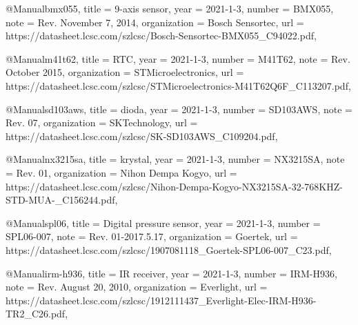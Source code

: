 @Manual{bmx055,
    title        = {9-axis sensor},
    year         = {2021-1-3},
    number       = {BMX055},
    note         = {Rev.  November 7, 2014},
    organization = {Bosch Sensortec},
    url          = {https://datasheet.lcsc.com/szlcsc/Bosch-Sensortec-BMX055\_C94022.pdf},
}

@Manual{m41t62,
    title        = {RTC},
    year         = {2021-1-3},
    number       = {M41T62},
    note         = {Rev. October 2015},
    organization = {STMicroelectronics},
    url          = {https://da\-ta\-sheet\-.lcsc.com/szlcsc/STMicroelectronics-M41T62Q6F\_C113207.pdf},
}

@Manual{sd103aws,
    title        = {dioda},
    year         = {2021-1-3},
    number       = {SD103AWS},
    note         = {Rev. 07},
    organization = {SKTechnology},
    url          = {https://datasheet.lcsc\-.\-com\-/szlcsc/SK-SD103AWS\_C109204.pdf},
}

@Manual{nx3215sa,
    title        = {krystal},
    year         = {2021-1-3},
    number       = {NX3215SA},
    note         = {Rev. 01}, %
    organization = {Nihon Dempa Kogyo},
    url          = {https://datasheet\-.\-lcsc\-.com/szlcsc/Nihon-Dempa-Kogyo-NX3215SA-32-768KHZ-STD-MUA-\-\_C156244.pdf},
}

@Manual{spl06,
    title        = {Digital pressure sensor},
    year         = {2021-1-3},
    number       = {SPL06-007},
    note         = {Rev. 01-2017.5.17},
    organization = {Goertek},
    url          = {https://datasheet.lcsc.com/szlcsc/1907081118\_Goertek-SPL06-007\_C23\-.pdf},
}

@Manual{irm-h936,
    title        = {IR receiver},
    year         = {2021-1-3},
    number       = {IRM-H936},
    note         = {Rev. August 20, 2010},
    organization = {Everlight},
    url          = {https://da\-ta\-sheet\-.lcsc.com/szlcsc/1912111437\_Everlight-Elec-IRM-H936-TR2\_C26\-.pdf},
}

